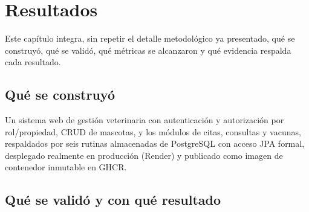 \chapter{Resultados}
\label{cap:resultados-final}

Este cap\'itulo integra, sin repetir el detalle metodol\'ogico ya
presentado, qu\'e se construy\'o, qu\'e se valid\'o, qu\'e m\'etricas se
alcanzaron y qu\'e evidencia respalda cada resultado.

\section{Qu\'e se construy\'o}

Un sistema web de gesti\'on veterinaria con autenticaci\'on y autorizaci\'on
por rol/propiedad, CRUD de mascotas, y los m\'odulos de citas, consultas y
vacunas, respaldados por seis rutinas almacenadas de PostgreSQL con acceso
JPA formal, desplegado realmente en producci\'on (Render) y publicado como
imagen de contenedor inmutable en GHCR.

\section{Qu\'e se valid\'o y con qu\'e resultado}

